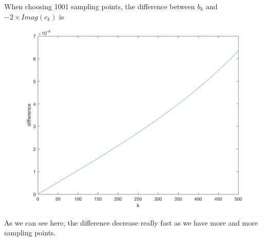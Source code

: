 \documentclass[11pt]{article} %
\begin{document}
When choosing 1001 sampling points, the difference between $b_{k}$ and $-2\times Imag(c_{k})$ is\\ 
\includegraphics[scale=0.4]{e323.png}\\
As we can see here, the difference decrease really fast as we have more and more sampling points.
\end{document}
